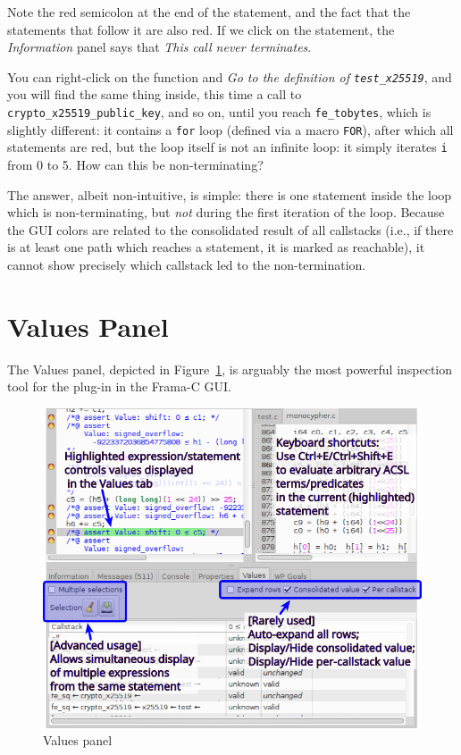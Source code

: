 Note the red semicolon at the end of the statement, and the fact that
the statements that follow it are also red. If we click on the statement, the
\emph{Information} panel says that \emph{This call never terminates}.

You can right-click on the function and \emph{Go to the definition of
\texttt{test\_x25519}}, and you will find the same thing inside, this time a call
to \texttt{crypto\_x25519\_public\_key}, and so on, until you reach
\texttt{fe\_tobytes}, which is slightly different: it contains a
\texttt{for} loop (defined via a macro \texttt{FOR}), after which all
statements are red, but the loop itself is not an infinite loop: it
simply iterates \texttt{i} from 0 to 5. How can this be non-terminating?

The answer, albeit non-intuitive, is simple: there is one statement
inside the loop which is non-terminating, but \emph{not} during the
first iteration of the loop. Because the GUI colors are related to the
consolidated result of all callstacks (i.e., if there is at least one
path which reaches a statement, it is marked as reachable), it cannot
show precisely which callstack led to the non-termination.


\section{Values Panel}\label{values-panel}

The Values panel, depicted in Figure~\ref{fig:values-panel}, is arguably
the most powerful inspection tool for the \Eva{} plug-in in the Frama-C GUI.

\begin{figure}[hbtp]
\centering
\includegraphics[width=\textwidth]{gui-images/gui-values-annotated.png}
\caption{Values panel}
\label{fig:values-panel}
\end{figure}

